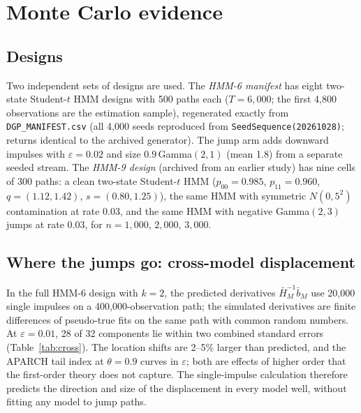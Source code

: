 \documentclass[11pt,a4paper]{article}
\theoremstyle{definition}
\theoremstyle{remark}
\begin{document}
\section{Monte Carlo evidence}\label{sec:mc}
\subsection{Designs}
Two independent sets of designs are used. The \emph{HMM-6 manifest} has eight two-state Student-$t$ HMM designs with 500 paths each ($T=6{,}000$; the first 4{,}800 observations are the estimation sample), regenerated exactly from \texttt{DGP\_MANIFEST.csv} (all 4{,}000 seeds reproduced from \texttt{SeedSequence(20261028)}; returns identical to the archived generator). The jump arm adds downward impulses with $\varepsilon=0.02$ and size $0.9\,$Gamma$(2,1)$ (mean 1.8) from a separate seeded stream. The \emph{HMM-9 design} (archived from an earlier study) has nine cells of 300 paths: a clean two-state Student-$t$ HMM ($p_{00}=0.985$, $p_{11}=0.960$, $q=(1.12,1.42)$, $s=(0.80,1.25)$), the same HMM with symmetric $N(0,5^2)$ contamination at rate 0.03, and the same HMM with negative Gamma$(2,3)$ jumps at rate 0.03, for $n=1{,}000$, $2{,}000$, $3{,}000$.

\subsection{Where the jumps go: cross-model displacement}\label{sec:cross}
In the full HMM-6 design with $k=2$, the predicted derivatives $\bar H_M^{-1}\bar b_M$ use 20{,}000 single impulses on a 400{,}000-observation path; the simulated derivatives are finite differences of pseudo-true fits on the same path with common random numbers. At $\varepsilon=0.01$, 28 of 32 components lie within two combined standard errors (Table~\ref{tab:cross}). The location shifts are 2--5\% larger than predicted, and the APARCH tail index at $\theta=0.9$ curves in $\varepsilon$; both are effects of higher order that the first-order theory does not capture. The single-impulse calculation therefore predicts the direction and size of the displacement in every model well, without fitting any model to jump paths.
\end{document}
